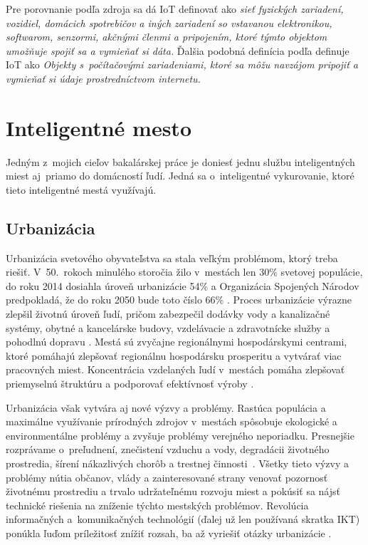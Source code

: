 Pre porovnanie podľa zdroja \cite{Shafiq2022} sa dá IoT definovať ako \emph{sieť fyzických zariadení, vozidiel, domácich spotrebičov a iných zariadení so vstavanou elektronikou, softwarom, senzormi, akčnými členmi a pripojením, ktoré týmto objektom umožňuje spojiť sa a vymieňať si dáta.} 
Ďalšia podobná definícia podľa \cite{cambridge} definuje IoT ako \emph{Objekty s~počítačovými zariadeniami, ktoré sa môžu navzájom pripojiť a vymieňať si údaje prostredníctvom internetu.}




\section{Inteligentné mesto}\label{iot-smartcity}
Jedným z~mojich cieľov bakalárskej práce je doniesť jednu službu inteligentných miest aj~priamo do domácností ľudí. 
Jedná sa o~inteligentné vykurovanie, ktoré tieto inteligentné mestá využívajú.

\subsection{Urbanizácia}
Urbanizácia svetového obyvateľstva sa stala veľkým problémom, ktorý treba riešiť. 
V~50.~rokoch minulého storočia žilo v~mestách len 30\% svetovej populácie, do roku 2014 dosiahla úroveň urbanizácie 54\% a Organizácia Spojených Národov predpokladá, že do roku 2050 bude toto číslo 66\% \cite{gerland2014world}. 
Proces urbanizácie výrazne zlepšil životnú úroveň ľudí, pričom zabezpečil dodávky vody a kanalizačné systémy, obytné a kancelárske budovy, vzdelávacie a zdravotnícke služby a pohodlnú dopravu \cite{davis1965urbanization}. 
Mestá sú zvyčajne regionálnymi hospodárskymi centrami, ktoré pomáhajú zlepšovať regionálnu hospodársku prosperitu a vytvárať viac pracovných miest. 
Koncentrácia vzdelaných ľudí v~mestách pomáha zlepšovať priemyselnú štruktúru a podporovať efektívnosť výroby \cite{bertinelli2004urbanization}.

Urbanizácia však vytvára aj nové výzvy a problémy. 
Rastúca populácia a maximálne využívanie prírodných zdrojov v~mestách spôsobuje ekologické a environmentálne problémy a zvyšuje problémy verejného neporiadku. 
Presnejšie rozprávame o~preľudnení, znečistení vzduchu a vody, degradácii životného prostredia, šírení nákazlivých chorôb a trestnej činnosti~\cite{haughton1997developing}. 
Všetky tieto výzvy a problémy nútia občanov, vlády a zainteresované strany venovať pozornosť životnému prostrediu a trvalo udržateľnému rozvoju miest a pokúsiť sa nájsť technické riešenia na zníženie týchto mestských problémov.
Revolúcia informačných a~komunikačných technológií (ďalej už len používaná skratka IKT) ponúkla ľuďom príležitosť znížiť rozsah, ba až vyriešiť otázky urbanizácie \cite{Yin2015}.

